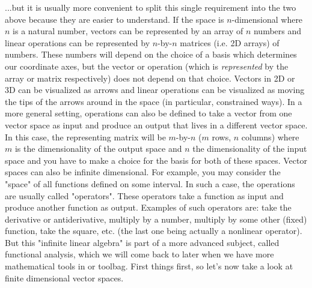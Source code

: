 ...but it is usually more convenient to split this single requirement into the two above because they are easier to understand. If the space is $n$-dimensional where $n$ is a natural number, vectors can be represented by an array of $n$ numbers and linear operations can be represented by $n$-by-$n$ matrices (i.e. 2D arrays) of numbers. These numbers will depend on the choice of a basis which determines our coordinate axes, but the vector or operation (which is \emph{represented} by the array or matrix respectively) does not depend on that choice. Vectors in 2D or 3D can be visualized as arrows and linear operations can be visualized as moving the tips of the arrows around in the space (in particular, constrained ways). In a more general setting, operations can also be defined to take a vector from one vector space as input and produce an output that lives in a different vector space. In this case, the representing matrix will be $m$-by-$n$ ($m$ rows, $n$ columns) where $m$ is the dimensionality of the output space and $n$ the dimensionality of the input space and you have to make a choice for the basis for both of these spaces. Vector spaces can also be infinite dimensional. For example, you may consider the "space" of all functions defined on some interval. In such a case, the operations are usually called "operators". These operators take a function as input and produce another function as output. Examples of such operators are: take the derivative or antiderivative, multiply by a number, multiply by some other (fixed) function, take the square, etc. (the last one being actually a nonlinear operator). But this "infinite linear algebra" is part of a more advanced subject, called functional analysis, which we will come back to later when we have more mathematical tools in or toolbag. First things first, so let's now take a look at finite dimensional vector spaces.


\begin{comment}

https://en.wikipedia.org/wiki/Linearity

\end{comment}